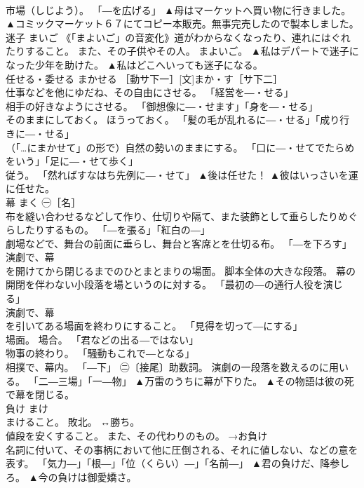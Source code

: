 \documentclass[8pt]{extreport}
\begin{document}
\begin{CJK}{UTF8}{min}
\\	市場（しじよう）。 「―を広げる」	▲母はマーケットへ買い物に行きました。 ▲コミックマーケット６７にてコピー本販売。無事完売したので製本しました。
\\	迷子	まいご	《「まよいご」の音変化》道がわからなくなったり、連れにはぐれたりすること。 また、その子供やその人。 まよいご。	▲私はデパートで迷子になった少年を助けた。 ▲私はどこへいっても迷子になる。
\\	任せる・委せる	まかせる	［動サ下一］[文]まか・す［サ下二］ 
\\	仕事などを他にゆだね、その自由にさせる。 「経営を―・せる」 
\\	相手の好きなようにさせる。 「御想像に―・せます」「身を―・せる」 
\\	そのままにしておく。 ほうっておく。 「髪の毛が乱れるに―・せる」「成り行きに―・せる」 
\\	（「…にまかせて」の形で）自然の勢いのままにする。 「口に―・せてでたらめをいう」「足に―・せて歩く」 
\\	従う。 「然ればすなはち先例に―・せて」	▲後は任せた！ ▲彼はいっさいを運に任せた。
\\	幕	まく	㊀［名］ 
\\	布を縫い合わせるなどして作り、仕切りや隔て、また装飾として垂らしたりめぐらしたりするもの。 「―を張る」「紅白の―」 
\\	劇場などで、舞台の前面に垂らし、舞台と客席とを仕切る布。 「―を下ろす」 
\\	演劇で、幕 
\\	を開けてから閉じるまでのひとまとまりの場面。 脚本全体の大きな段落。 幕の開閉を伴わない小段落を場というのに対する。 「最初の―の通行人役を演じる」 
\\	演劇で、幕 
\\	を引いてある場面を終わりにすること。 「見得を切って―にする」 
\\	場面。 場合。 「君などの出る―ではない」 
\\	物事の終わり。 「騒動もこれで―となる」 
\\	相撲で、幕内。 「―下」 ㊁〔接尾〕助数詞。 演劇の一段落を数えるのに用いる。 「二―三場」「一―物」	▲万雷のうちに幕が下りた。 ▲その物語は彼の死で幕を閉じる。
\\	負け	まけ	
\\	まけること。 敗北。 ↔勝ち。 
\\	値段を安くすること。 また、その代わりのもの。 →お負け 
\\	名詞に付いて、その事柄において他に圧倒される、それに値しない、などの意を表す。 「気力―」「根―」「位（くらい）―」「名前―」	▲君の負けだ、降参しろ。 ▲今の負けは御愛嬌さ。

\end{CJK}
\end{document}
